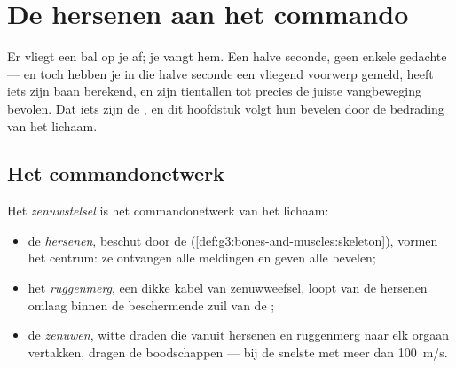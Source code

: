 \chapter{De hersenen aan het commando}\label{ch:g5:brain-in-command}

Er vliegt een bal op je af; je vangt hem. Een halve seconde, geen enkele
gedachte --- en toch hebben je  in die halve seconde een vliegend
voorwerp gemeld, heeft iets zijn baan berekend, en zijn tientallen
 tot precies de juiste vangbeweging bevolen. Dat iets zijn de
, en dit hoofdstuk volgt hun bevelen door de bedrading van het
lichaam.

\section{Het commandonetwerk}

\begin{definition}\label{def:g5:brain-in-command:system}
Het \emph{zenuwstelsel} is het commandonetwerk van
het lichaam:
\begin{itemize}
  \item de \emph{hersenen}, beschut door de 
        (\cref{def:g3:bones-and-muscles:skeleton}), vormen het centrum:
        ze ontvangen alle meldingen en geven alle bevelen;
  \item het \emph{ruggenmerg}, een dikke kabel van
        zenuwweefsel, loopt van de hersenen omlaag binnen de
        beschermende zuil van de ;
  \item de \emph{zenuwen}, witte draden die vanuit hersenen
        en ruggenmerg naar elk orgaan vertakken, dragen de boodschappen
        --- bij de snelste met meer dan \qty{100}{m/s}.
\end{itemize}
\end{definition}

